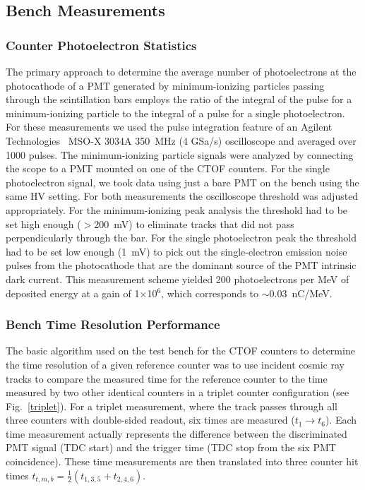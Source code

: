 \documentclass{elsart}
\begin{document}
\subsection{Bench Measurements}
\label{sec:bench}

\subsubsection{Counter Photoelectron Statistics}
\label{sec:npe}

The primary approach to determine the average number of photoelectrons at the photocathode of a PMT
generated by minimum-ionizing particles passing through the scintillation bars employs the ratio of the
integral of the pulse for a minimum-ionizing particle to the integral of a pulse for a single photoelectron.
For these measurements we used the pulse integration feature of an Agilent Technologies~\cite{agilent-ref}
MSO-X 3034A 350~MHz (4 GSa/s) oscilloscope and averaged over 1000 pulses. The minimum-ionizing particle
signals were analyzed by connecting the scope to a PMT mounted on one of the CTOF counters. For the single
photoelectron signal, we took data using just a bare PMT on the bench using the same HV setting. For both
measurements the oscilloscope threshold was adjusted appropriately. For the minimum-ionizing peak analysis
the threshold had to be set high enough ($>$200~mV) to eliminate tracks that did not pass perpendicularly
through the bar. For the single photoelectron peak the threshold had to be set low enough (1~mV) to pick out
the single-electron emission noise pulses from the photocathode that are the dominant source of the PMT
intrinsic dark current. This measurement scheme yielded 200 photoelectrons per MeV of deposited energy
at a gain of 1$\times$10$^6$, which corresponds to $\sim$0.03~nC/MeV.

\subsubsection{Bench Time Resolution Performance}
\label{sec-bench}

The basic algorithm used on the test bench for the CTOF counters to determine the time resolution of
a given reference counter was to use incident cosmic ray tracks to compare the measured time
for the reference counter to the time measured by two other identical counters in a triplet counter
configuration (see Fig.~\ref{triplet}). For a triplet measurement, where the track passes through all
three counters with double-sided readout, six times are measured ($t_1 \to t_6$). Each time measurement
actually represents the difference between the discriminated PMT signal (TDC start) and the trigger time
(TDC stop from the six PMT coincidence). These time measurements are then translated into three counter
hit times $t_{t,m,b} = \frac{1}{2}(t_{1,3,5} + t_{2,4,6})$.
\end{document}
